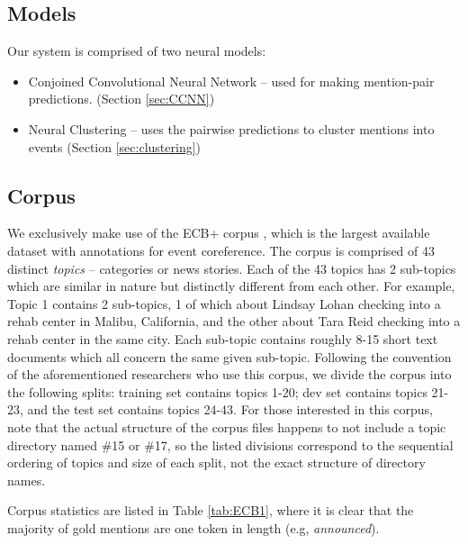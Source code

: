 \documentclass[11pt,a4paper]{article}
\begin{document}
\subsection{Models}
Our system is comprised of two neural models:
\begin{itemize}
  \item Conjoined Convolutional Neural Network -- used for making mention-pair predictions.  (Section \ref{sec:CCNN})
  \item Neural Clustering -- uses the pairwise predictions to cluster mentions into events (Section \ref{sec:clustering})
\end{itemize}
\subsection{Corpus}
\label{sec:corpus}
We exclusively make use of the ECB+ corpus \cite{ECB+}, which is the largest available dataset with annotations for event coreference.  The corpus is comprised of 43 distinct \textit{topics} -- categories or news stories.  Each of the 43 topics has 2 sub-topics which are similar in nature but distinctly different from each other.  For example, Topic 1 contains 2 sub-topics, 1 of which about Lindsay Lohan checking into a rehab center in Malibu, California, and the other about Tara Reid checking into a rehab center in the same city.  Each sub-topic contains roughly 8-15 short text documents which all concern the same given sub-topic.  Following the convention of the aforementioned researchers who use this corpus, we divide the corpus into the following splits: training set contains topics 1-20; dev set contains topics 21-23, and the test set contains topics 24-43.  For those interested in this corpus, note that the actual structure of the corpus files happens to not include a topic directory named \#15 or \#17, so the listed divisions correspond to the sequential ordering of topics and size of each split, not the exact structure of directory names.

Corpus statistics are listed in Table \ref{tab:ECB1}, where it is clear that the majority of gold mentions are one token in length (e.g, \textit{announced}).
\end{document}
